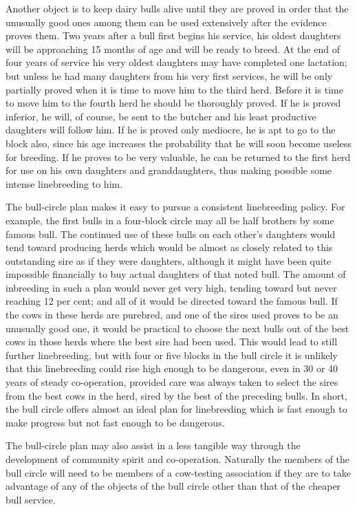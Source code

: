 Another object is to keep dairy bulls alive until they are proved in
order that the unusually good ones among them can be used extensively
after the evidence proves them. Two years after a bull first begins his
service, his oldest daughters will be approaching 15 months of age and
will be ready to breed. At the end of four years of service his very oldest
daughters may have completed one lactation; but unless he had many
daughters from his very first services, he will be only partially proved
when it is time to move him to the third herd. Before it is time to move
him to the fourth herd he should be thoroughly proved. If he is proved
inferior, he will, of course, be sent to the butcher and his least productive
daughters will follow him. If he is proved only mediocre, he is apt
to go to the block also, since his age increases the probability that he
will soon become useless for breeding. If he proves to be very valuable,
he can be returned to the first herd for use on his own daughters and
granddaughters, thus making possible some intense linebreeding to
him.

The bull-circle plan makes it easy to pursue a consistent linebreeding
policy. For example, the first bulls in a four-block circle may all be
half brothers by some famous bull. The continued use of these bulls on
each other's daughters would tend toward producing herds which
would be almost as closely related to this outstanding sire as if they were
daughters, although it might have been quite impossible financially to
buy actual daughters of that noted bull. The amount of inbreeding in
such a plan would never get very high, tending toward but never reaching
12 per cent; and all of it would be directed toward the famous
bull. If the cows in these herds are purebred, and one of the sires used
proves to be an unusually good one, it would be practical to choose the
next bulls out of the best cows in those herds where the best sire had
been used. This would lead to still further linebreeding, but with four
or five blocks in the bull circle it is unlikely that this linebreeding could
rise high enough to be dangerous, even in 30 or 40 years of steady co-operation,
provided care was always taken to select the sires from the best
cows in the herd, sired by the best of the preceding bulls. In short, the
bull circle offers almost an ideal plan for linebreeding which is fast
enough to make progress but not fast enough to be dangerous.

The bull-circle plan may also assist in a less tangible way through
the development of community spirit and co-operation. Naturally the
members of the bull circle will need to be members of a cow-testing
association if they are to take advantage of any of the objects of the
bull circle other than that of the cheaper bull service.

